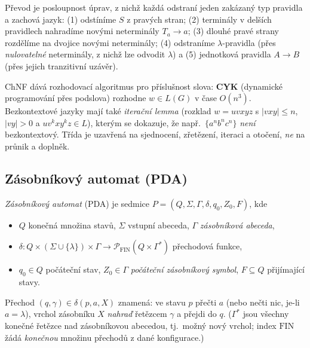 \documentclass[11pt,a4paper]{article}
\begin{document}
\begin{intuice}
Převod je posloupnost úprav, z nichž každá odstraní jeden zakázaný typ pravidla a zachová jazyk: (1) odstíníme $S$ z pravých stran; (2) terminály v delších pravidlech nahradíme novými neterminály $T_a\to a$; (3) dlouhé pravé strany rozdělíme na dvojice novými neterminály; (4) odstraníme $\lambda$-pravidla (přes \emph{nulovatelné} neterminály, z nichž lze odvodit $\lambda$) a (5) jednotková pravidla $A\to B$ (přes jejich tranzitivní uzávěr).
\end{intuice}

\begin{poznamka}
ChNF dává rozhodovací algoritmus pro příslušnost slova: \textbf{CYK} (dynamické programování přes podslova) rozhodne $w\in L(G)$ v čase $O(n^3)$. Bezkontextové jazyky mají také \emph{iterační lemma} (rozklad $w=uvxyz$ s $|vxy|\le n$, $|vy|>0$ a $uv^kxy^kz\in L$), kterým se dokazuje, že např.\ $\{a^nb^nc^n\}$ \emph{není} bezkontextový. Třída je uzavřená na sjednocení, zřetězení, iteraci a otočení, \emph{ne} na průnik a doplněk.
\end{poznamka}

\subsection{Zásobníkový automat (PDA)}

\begin{definice}
\emph{Zásobníkový automat} (PDA) je sedmice $P=(Q,\Sigma,\Gamma,\delta,q_0,Z_0,F)$, kde
\begin{itemize}
  \item $Q$ konečná množina stavů, $\Sigma$ vstupní abeceda, $\Gamma$ \emph{zásobníková abeceda},
  \item $\delta\colon Q\times(\Sigma\cup\{\lambda\})\times\Gamma\to\mathcal P_{\mathrm{FIN}}(Q\times\Gamma^*)$ přechodová funkce,
  \item $q_0\in Q$ počáteční stav, $Z_0\in\Gamma$ \emph{počáteční zásobníkový symbol}, $F\subseteq Q$ přijímající stavy.
\end{itemize}
Přechod $(q,\gamma)\in\delta(p,a,X)$ znamená: ve stavu $p$ přečti $a$ (nebo nečti nic, je-li $a=\lambda$), vrchol zásobníku $X$ \emph{nahraď} řetězcem $\gamma$ a přejdi do $q$. ($\Gamma^*$ jsou všechny konečné řetězce nad zásobníkovou abecedou, tj.\ možný nový vrchol; index $\mathrm{FIN}$ žádá \emph{konečnou} množinu přechodů z dané konfigurace.)
\end{definice}
\end{document}
